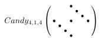 $Candy_{4,1,4}\left(\begin{smallmatrix}
  &   &   & \bullet &   &   &   \\
  &   &   &   & \bullet &   &   \\
  &   &   &   &   & \bullet &   \\
\bullet &   &   & \bullet &   &   & \bullet \\
  & \bullet &   &   &   &   &   \\
  &   & \bullet &   &   &   &   \\
  &   &   & \bullet &   &   & 
\end{smallmatrix}\right)$
